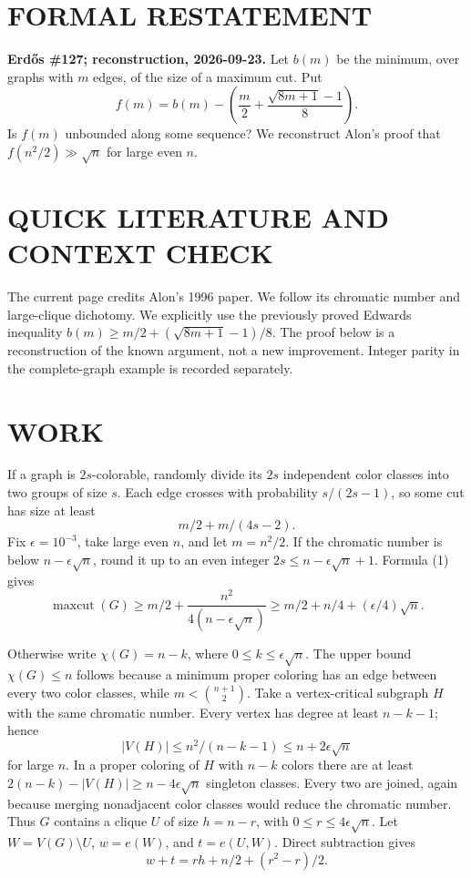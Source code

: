 \section{FORMAL RESTATEMENT}
\textbf{Erd\H{o}s \#127; reconstruction, 2026-09-23.}
Let $b(m)$ be the minimum, over graphs with $m$ edges, of the size of
a maximum cut. Put
\[
 f(m)=b(m)-\left(\frac m2+\frac{\sqrt{8m+1}-1}{8}\right).
\]
Is $f(m)$ unbounded along some sequence? We reconstruct Alon's proof
that $f(n^2/2)\gg\sqrt n$ for large even $n$.

\section{QUICK LITERATURE AND CONTEXT CHECK}
The current page credits Alon's 1996 paper. We follow its chromatic
number and large-clique dichotomy. We explicitly use the previously
proved Edwards inequality $b(m)\ge m/2+(\sqrt{8m+1}-1)/8$.
The proof below is a reconstruction of the known argument, not a new
improvement. Integer parity in the complete-graph example is recorded
separately.

\section{WORK}
If a graph is $2s$-colorable, randomly divide its $2s$ independent color
classes into two groups of size $s$. Each edge crosses with probability
$s/(2s-1)$, so some cut has size at least
\[
 m/2+m/(4s-2).                                             \tag{1}
\]
Fix $\epsilon=10^{-3}$, take large even $n$, and let $m=n^2/2$.
If the chromatic number is below $n-\epsilon\sqrt n$, round it up to
an even integer $2s\le n-\epsilon\sqrt n+1$. Formula (1) gives
\[
 \operatorname{maxcut}(G)\ge m/2+
 \frac{n^2}{4(n-\epsilon\sqrt n)}
 \ge m/2+n/4+(\epsilon/4)\sqrt n.                         \tag{2}
\]

Otherwise write $\chi(G)=n-k$, where $0\le k\le\epsilon\sqrt n$.
The upper bound $\chi(G)\le n$ follows because a minimum proper coloring
has an edge between every two color classes, while
$m<\binom{n+1}{2}$. Take a vertex-critical subgraph $H$ with the same
chromatic number. Every vertex has degree at least $n-k-1$; hence
\[
 |V(H)|\le n^2/(n-k-1)\le n+2\epsilon\sqrt n
\]
for large $n$. In a proper coloring of $H$ with $n-k$ colors there are
at least $2(n-k)-|V(H)|\ge n-4\epsilon\sqrt n$ singleton classes.
Every two are joined, again because merging nonadjacent color classes
would reduce the chromatic number. Thus $G$ contains a clique $U$ of
size $h=n-r$, with $0\le r\le4\epsilon\sqrt n$.
Let $W=V(G)\setminus U$, $w=e(W)$, and $t=e(U,W)$. Direct subtraction gives
\[
 w+t=rh+n/2+(r^2-r)/2.                                    \tag{3}
\]


